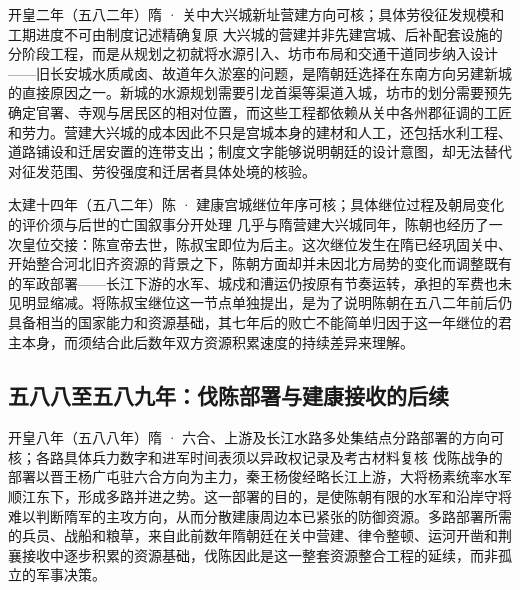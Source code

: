 \begin{event}{}{开皇二年（五八二年）}{隋 · 关中大兴城新址}{营建方向可核；具体劳役征发规模和工期进度不可由制度记述精确复原}
大兴城的营建并非先建宫城、后补配套设施的分阶段工程，而是从规划之初就将水源引入、坊市布局和交通干道同步纳入设计——旧长安城水质咸卤、故道年久淤塞的问题，是隋朝廷选择在东南方向另建新城的直接原因之一。新城的水源规划需要引龙首渠等渠道入城，坊市的划分需要预先确定官署、寺观与居民区的相对位置，而这些工程都依赖从关中各州郡征调的工匠和劳力。营建大兴城的成本因此不只是宫城本身的建材和人工，还包括水利工程、道路铺设和迁居安置的连带支出；制度文字能够说明朝廷的设计意图，却无法替代对征发范围、劳役强度和迁居者具体处境的核验。
\end{event}

\begin{event}{}{太建十四年（五八二年）}{陈 · 建康宫城}{继位年序可核；具体继位过程及朝局变化的评价须与后世的亡国叙事分开处理}
几乎与隋营建大兴城同年，陈朝也经历了一次皇位交接：陈宣帝去世，陈叔宝即位为后主。这次继位发生在隋已经巩固关中、开始整合河北旧齐资源的背景之下，陈朝方面却并未因北方局势的变化而调整既有的军政部署——长江下游的水军、城戍和漕运仍按原有节奏运转，承担的军费也未见明显缩减。将陈叔宝继位这一节点单独提出，是为了说明陈朝在五八二年前后仍具备相当的国家能力和资源基础，其七年后的败亡不能简单归因于这一年继位的君主本身，而须结合此后数年双方资源积累速度的持续差异来理解。
\end{event}

\subsection{五八八至五八九年：伐陈部署与建康接收的后续}

\begin{event}{}{开皇八年（五八八年）}{隋 · 六合、上游及长江水路多处集结点}{分路部署的方向可核；各路具体兵力数字和进军时间表须以异政权记录及考古材料复核}
伐陈战争的部署以晋王杨广屯驻六合方向为主力，秦王杨俊经略长江上游，大将杨素统率水军顺江东下，形成多路并进之势。这一部署的目的，是使陈朝有限的水军和沿岸守将难以判断隋军的主攻方向，从而分散建康周边本已紧张的防御资源。多路部署所需的兵员、战船和粮草，来自此前数年隋朝廷在关中营建、律令整顿、运河开凿和荆襄接收中逐步积累的资源基础，伐陈因此是这一整套资源整合工程的延续，而非孤立的军事决策。
\end{event}

